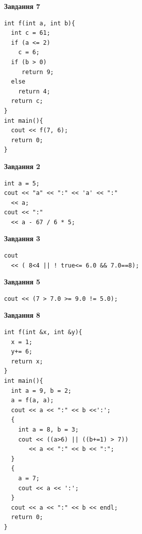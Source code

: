 \documentclass[12pt, ukrainian]{article}
\begin{document}
{\begin {large}
\begin{minipage}[t]{7.0cm}
\begin{center}
\textbf{Завдання 7}
\end{center}
\vspace{-8mm}

\begin{verbatim}
int f(int a, int b){
  int c = 61;
  if (a <= 2)
    c = 6;
  if (b > 0)
     return 9;
  else
    return 4;
  return c;
}
int main(){
  cout << f(7, 6);
  return 0;
}
\end{verbatim}

\end{minipage}
\vline \hspace{1mm}
\begin{minipage}[t]{11.0cm}

\begin{center}
\textbf{Завдання 2}
\end{center}
\vspace{-8mm}

\begin{verbatim}
int a = 5;
cout << "a" << ":" << 'a' << ":" 
  << a;
cout << ":" 
  << a - 67 / 6 * 5;
\end{verbatim}



\begin{center}
\textbf{Завдання 3}
\end{center}
\vspace{-8mm}

\begin{verbatim}
cout 
  << ( 8<4 || ! true<= 6.0 && 7.0==8);
\end{verbatim}



\begin{center}
\textbf{Завдання 5}
\end{center}
\vspace{-8mm}

\begin{verbatim}
cout << (7 > 7.0 >= 9.0 != 5.0);
\end{verbatim}



\begin{center}
\textbf{Завдання 8}
\end{center}
\vspace{-8mm}

\begin{verbatim}
int f(int &x, int &y){
  x = 1;
  y+= 6;
  return x;
}
int main(){
  int a = 9, b = 2;
  a = f(a, a);
  cout << a << ":" << b <<':';
  {
    int a = 8, b = 3;
    cout << ((a>6) || ((b+=1) > 7))
       << a << ":" << b << ":";
  }
  {
    a = 7;
    cout << a << ':';
  }
  cout << a << ":" << b << endl;
  return 0;
}
\end{verbatim}


\end{minipage}
\end{large}}
\end{document}

